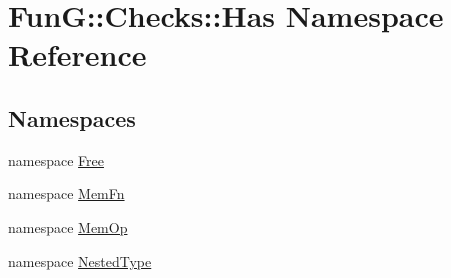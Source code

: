 \hypertarget{namespaceFunG_1_1Checks_1_1Has}{\section{\-Fun\-G\-:\-:\-Checks\-:\-:\-Has \-Namespace \-Reference}
\label{namespaceFunG_1_1Checks_1_1Has}
}
\subsection*{\-Namespaces}
\begin{DoxyCompactItemize}
\item 
namespace \hyperlink{namespaceFunG_1_1Checks_1_1Has_1_1Free}{\-Free}
\item 
namespace \hyperlink{namespaceFunG_1_1Checks_1_1Has_1_1MemFn}{\-Mem\-Fn}
\item 
namespace \hyperlink{namespaceFunG_1_1Checks_1_1Has_1_1MemOp}{\-Mem\-Op}
\item 
namespace \hyperlink{namespaceFunG_1_1Checks_1_1Has_1_1NestedType}{\-Nested\-Type}
\end{DoxyCompactItemize}
